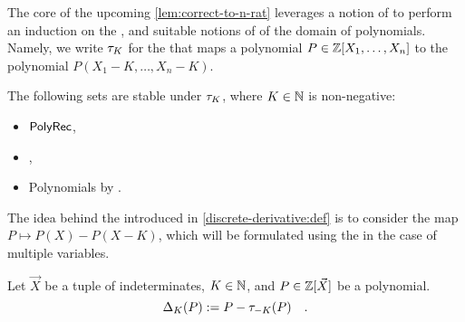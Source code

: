 \AP The core of the upcoming \cref{lem:correct-to-n-rat} leverages a notion of
 to perform an induction on the ,
and suitable notions of  of the domain of polynomials. Namely,
we write $\tau_{K}$ for the  that maps a
polynomial $P \in \mathbb{Z}[X_1, \dots, X_n]$ to the polynomial $P(X_1 - K, \dots,
X_n - K)$.

\begin{fact}
    \label{translation-invariance:fact}
    The following sets are stable under 
    $\tau_{K}$,
    where $K \in \mathbb{N}$ is non-negative:
    \begin{itemize}
        \item $\mathsf{PolyRec}$,
        \item {},
        \item Polynomials 
            by .
    \end{itemize}
\end{fact}

The idea behind the  introduced in
\cref{discrete-derivative:def} is to consider the map $P \mapsto P(X) -
P(X-K)$, which will be formulated using the  in the
case of multiple variables.

\begin{definition}
    \label{discrete-derivative:def}
    Let $\vec{X}$ be a tuple of indeterminates,
    $K \in \mathbb{N}$,
    and 
    $P \in \mathbb{Z}[\vec{X}]$ be a polynomial.
    \begin{equation*}
        \Delta_{K}(P) \mathrel{:=} 
        P - \tau_{-K}(P) \quad .
    \end{equation*}
\end{definition}

